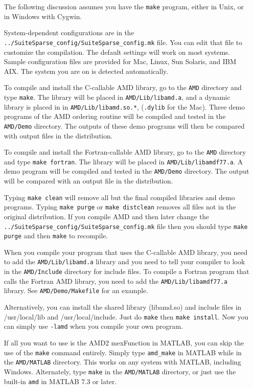 \documentclass[11pt]{article}
\begin{document}
The following discussion assumes you have the {\tt make} program, either in
Unix, or in Windows with Cygwin.

System-dependent configurations are in the
{\tt ../SuiteSparse\_config/SuiteSparse\_config.mk}
file.  You can edit that file to customize the compilation.  The default
settings will work on most systems.
Sample configuration files are provided
for Mac, Linux, Sun Solaris, and IBM AIX.
The system you are on is detected automatically.

To compile and install the C-callable AMD library,
go to the {\tt AMD} directory and type {\tt make}.
The library will be placed in {\tt AMD/Lib/libamd.a},
and a dynamic library is placed in
in {\tt AMD/Lib/libamd.so.*}, ({\tt *.dylib} for the Mac).
Three demo programs of the AMD ordering routine will be compiled and tested in
the {\tt AMD/Demo} directory.
The outputs of these demo programs will then be compared with output
files in the distribution.

To compile and install the Fortran-callable AMD library,
go to the {\tt AMD} directory and type {\tt make fortran}.
The library will be placed in {\tt AMD/Lib/libamdf77.a}.
A demo program will be compiled and tested in the {\tt AMD/Demo} directory.
The output will be compared with an output file in the distribution.

Typing {\tt make clean} will remove all but the final compiled libraries
and demo programs.  Typing {\tt make purge} or {\tt make distclean}
removes all files not in the original distribution.
If you compile AMD and then later change the
{\tt ../SuiteSparse\_config/SuiteSparse\_config.mk} file
then you should type {\tt make purge} and then {\tt make} to recompile.

When you compile your program that uses the C-callable AMD library,
you need to add the {\tt AMD/Lib/libamd.a} library
and you need to tell your compiler to look in the
{\tt AMD/Include} directory for include
files.   To compile a Fortran program that calls the Fortran AMD library,
you need to add the {\tt AMD/Lib/libamdf77.a} library.
See {\tt AMD/Demo/Makefile} for an example.

Alternatively, you can install the shared library (libamd.so)
and include files in /usr/local/lib and /usr/local/include.
Just do {\tt make} then {\tt make install}.
Now you can simply use {\tt -lamd} when you compile your own program.

If all you want to use is the AMD2 mexFunction in MATLAB, you can skip
the use of the {\tt make} command entirely.  Simply type
{\tt amd\_make} in MATLAB while in the {\tt AMD/MATLAB} directory.
This works on any system with MATLAB, including Windows.
Alternately, type {\tt make} in the {\tt AMD/MATLAB} directory,
or just use the built-in {\tt amd} in MATLAB 7.3 or later.
\end{document}
